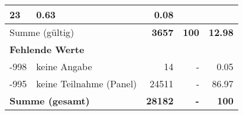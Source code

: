 \begin{longtable}{lXrrr}
       \num{23} &
       \num[round-mode=places,round-precision=2]{0,63} &
         \num[round-mode=places,round-precision=2]{0,08} \\
     \midrule
     \multicolumn{2}{l}{Summe (gültig)} &
       \textbf{\num{3657}} &
     \textbf{100} &
       \textbf{\num[round-mode=places,round-precision=2]{12,98}} \\
     \multicolumn{5}{l}{\textbf{Fehlende Werte}}\\
       -998 &
       keine Angabe &
         \num{14} &
        - &
         \num[round-mode=places,round-precision=2]{0,05} \\
       -995 &
       keine Teilnahme (Panel) &
         \num{24511} &
        - &
         \num[round-mode=places,round-precision=2]{86,97} \\
     \midrule
     \multicolumn{2}{l}{\textbf{Summe (gesamt)}} &
          \textbf{\num{28182}} &
        \textbf{-} &
        \textbf{100} \\
     \bottomrule
     \end{longtable}
     
